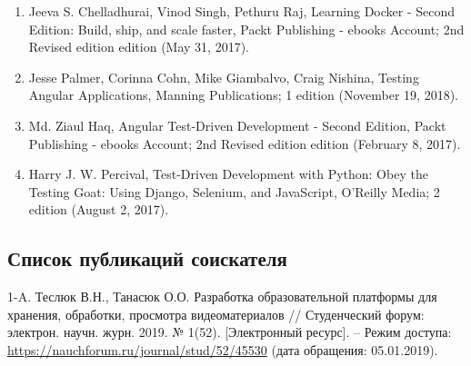 \begin{enumerate}[wide,topsep=0pt]
\item
Jeeva S. Chelladhurai, Vinod Singh, Pethuru Raj,
Learning Docker - Second Edition: Build, ship, and scale faster,
Packt Publishing - ebooks Account; 2nd Revised edition edition (May 31, 2017).

\item
Jesse Palmer, Corinna Cohn, Mike Giambalvo, Craig Nishina,
Testing Angular Applications,
Manning Publications; 1 edition (November 19, 2018).

\item
Md. Ziaul Haq,
Angular Test-Driven Development - Second Edition,
Packt Publishing - ebooks Account; 2nd Revised edition edition (February 8, 2017).

\item
Harry J. W. Percival,
Test-Driven Development with Python: Obey the Testing Goat: Using Django, Selenium, and JavaScript,
O'Reilly Media; 2 edition (August 2, 2017).

\end{enumerate}


\newpage

\subsection*{Список публикаций соискателя}

1-A. Теслюк В.Н., Танасюк О.О.
  Разработка образовательной платформы для хранения, обработки, просмотра видеоматериалов
  // Студенческий форум: электрон. научн. журн. 2019. № 1(52).
  [Электронный ресурс]. – Режим доступа:
  \href{https://nauchforum.ru/journal/stud/52/45530}{https://nauchforum.ru/journal/stud/52/45530}
  (дата обращения: 05.01.2019).


\endgroup